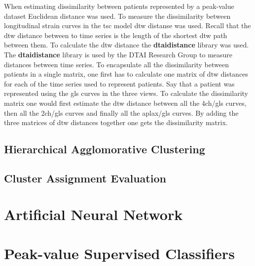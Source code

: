 When estimating dissimilarity between patients represented by a peak-value dataset Euclidean distance was used. To measure the dissimilarity between longitudinal strain curves in the \acrshort{tsc} model \acrshort{dtw} distanse was used. Recall that the \acrshort{dtw} distance between to time series is the length of the shortest \acrshort{dtw} path between them. To calculate the \acrshort{dtw} distance the \textbf{dtaidistance} library was used. The \textbf{dtaidistance} library is used by the DTAI Research Group to measure distances between time series. To encapsulate all the dissimilarity between patients in a single matrix, one first has to calculate one matrix of \acrshort{dtw} distances for each of the time series used to represent patients. Say that a patient was represented using the \acrshort{gls} curves in the three views. To calculate the dissimilarity matrix one would first estimate the \acrshort{dtw} distance between all the \acrshort{4ch}/\acrshort{gls} curves, then all the \acrshort{2ch}/\acrshort{gls} curves and finally all the \acrshort{aplax}/\acrshort{gls} curves. By adding the three matrices of \acrshort{dtw} distances together one gets the dissimilarity matrix. \bigskip

\subsection{Hierarchical Agglomorative Clustering}

\subsection{Cluster Assignment Evaluation}

\section{Artificial Neural Network} \label{sec:meth_nn}

\section{Peak-value Supervised Classifiers} \label{sec:meth_pvsc}


